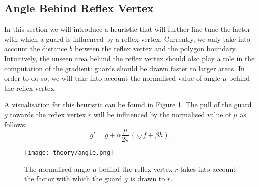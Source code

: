\subsection{Angle Behind Reflex Vertex}
In this section we will introduce a heuristic that will further fine-tune the factor with which a guard is influenced by a reflex vertex. Currently, we only take into account the distance $b$ between the reflex vertex and the polygon boundary. Intuitively, the unseen area behind the reflex vertex should also play a role in the computation of the gradient: guards should be drawn faster to larger areas. In order to do so, we will take into account the normalised value of angle $\mu$ behind the reflex vertex.

A visualisation for this heuristic can be found in Figure \ref{fig:angle}. The pull of the guard $g$ towards the reflex vertex $r$ will be influenced by the normalised value of $\mu$ as follows: $$g' = g + \alpha \frac{\mu}{2\pi}(\bigtriangledown f + \beta h).$$

\begin{figure}[h!]
    \centering
    \texttt{[image: theory/angle.png]}
    \caption{The normalised angle $\mu$ behind the reflex vertex $r$ takes into account the factor with which the guard $g$ is drawn to $r$.}
    \label{fig:angle}
\end{figure}